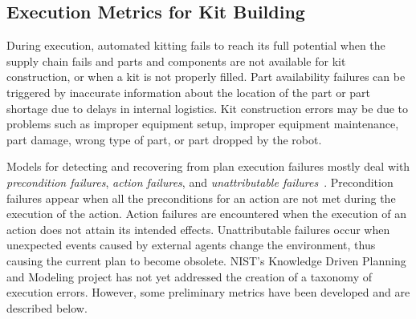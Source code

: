 \subsection{Execution Metrics for Kit Building}
During execution, automated kitting fails to reach its full potential when the supply chain fails and parts and components are not available for kit construction, or when a kit is not properly filled. Part availability failures can be triggered by inaccurate information about the location of the part or part shortage due to delays in internal logistics. Kit construction errors may be due to problems such as improper equipment setup, improper equipment maintenance, part damage, wrong type of part, or part dropped by the robot.


Models for detecting and recovering from plan execution failures mostly deal with \textit{precondition failures}, \textit{action failures}, and \textit{unattributable failures}~\cite{Myers1998}. Precondition failures appear when all the preconditions for an action are not met during the execution of the action. Action failures are encountered when the execution of an action does not attain its intended effects. Unattributable failures occur when unexpected events caused by external agents change the environment, thus causing the current plan to become obsolete. NIST\rq{}s Knowledge Driven Planning and Modeling project has not yet addressed the creation of a taxonomy of  execution errors. However, some preliminary metrics have been developed and are described
below.

